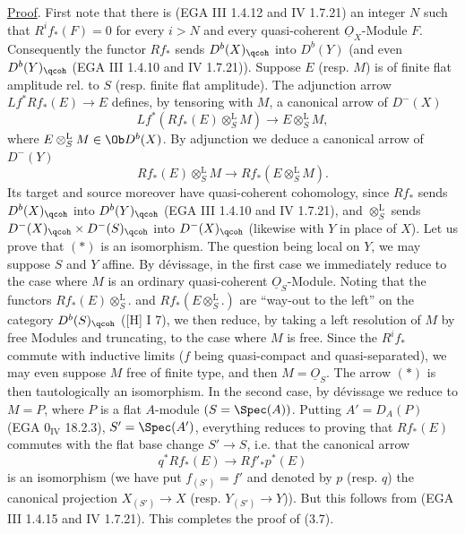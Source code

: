 \uline{Proof}. First note that there is (EGA III 1.4.12 and IV 1.7.21) an integer \(N\) such that \(R^if_*(F)=0\) for every \(i>N\) and every quasi-coherent \(\underline{O}_X\)-Module \(F\). Consequently the functor \(Rf_*\) sends \(D^b(X)_{\qcoh}\) into \(D^b(Y)\) (and even \(D^b(Y)_{\qcoh}\) (EGA III 1.4.10 and IV 1.7.21)). Suppose \(E\) (resp. \(M\)) is of finite flat amplitude rel. to \(S\) (resp. finite flat amplitude). The adjunction arrow \(Lf^*Rf_*(E)\longrightarrow E\) defines, by tensoring with \(M\), a canonical arrow of \(D^-(X)\)
\[
 Lf^*(Rf_*(E)\otimes_S^{\mathrm L}M)
 \longrightarrow E\otimes_S^{\mathrm L}M,
\]
where \(E\otimes_S^{\mathrm L}M\in\Ob D^b(X)\). By adjunction we deduce a canonical arrow of \(D^-(Y)\)
\[
 Rf_*(E)\otimes_S^{\mathrm L}M
 \longrightarrow Rf_*(E\otimes_S^{\mathrm L}M).\tag{*}
\]
Its target and source moreover have quasi-coherent cohomology, since \(Rf_*\) sends \(D^b(X)_{\qcoh}\) into \(D^b(Y)_{\qcoh}\) (EGA III 1.4.10 and IV 1.7.21), and \(\otimes_S^{\mathrm L}\) sends \(D^-(X)_{\qcoh}\times D^-(S)_{\qcoh}\) into \(D^-(X)_{\qcoh}\) (likewise with \(Y\) in place of \(X\)). Let us prove that \((*)\) is an isomorphism. The question being local on \(Y\), we may suppose \(S\) and \(Y\) affine. By dévissage, in the first case we immediately reduce to the case where \(M\) is an ordinary quasi-coherent \(\underline{O}_S\)-Module. Noting that the functors \(Rf_*(E)\otimes_S^{\mathrm L}.\) and \(Rf_*(E\otimes_S^{\mathrm L}.)\) are ``way-out to the left'' on the category \(D^b(S)_{\qcoh}\) ([H] I 7), we then reduce, by taking a left resolution of \(M\) by free Modules and truncating, to the case where \(M\) is free. Since the \(R^if_*\) commute with inductive limits (\(f\) being quasi-compact and quasi-separated), we may even suppose \(M\) free of finite type, and then \(M=\underline{O}_S\). The arrow \((*)\) is then tautologically an isomorphism. In the second case, by dévissage we reduce to \(M=P\), where \(P\) is a flat \(A\)-module
%
\((S=\Spec(A))\). Putting \(A'=D_A(P)\) (EGA \(0_{\mathrm{IV}}\) 18.2.3), \(S'=\Spec(A')\), everything reduces to proving that \(Rf_*(E)\) commutes with the flat base change \(S'\to S\), i.e. that the canonical arrow
\[
 q^*Rf_*(E)\longrightarrow Rf'_*p^*(E)
\]
is an isomorphism (we have put \(f_{(S')}=f'\) and denoted by \(p\) (resp. \(q\)) the canonical projection \(X_{(S')}\longrightarrow X\) (resp. \(Y_{(S')}\longrightarrow Y\))). But this follows from (EGA III 1.4.15 and IV 1.7.21). This completes the proof of (3.7).

